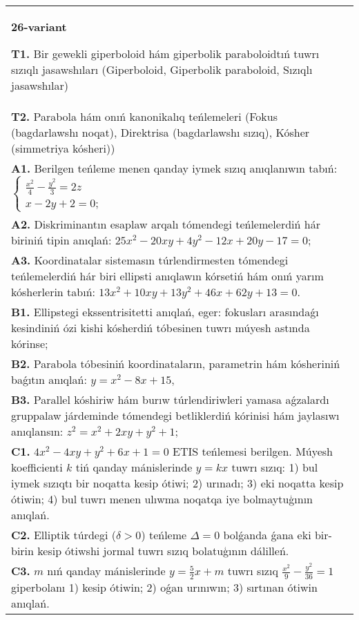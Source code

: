 \documentclass{article}
\begin{document}
\begin{tabular}{m{17cm}}
\textbf{26-variant}
\newline

\textbf{T1.} Bir gewekli giperboloid hám giperbolik paraboloidtıń tuwrı sızıqlı jasawshıları (Giperboloid, Giperbolik paraboloid, Sızıqlı jasawshılar) \\
\textbf{T2.} Parabola hám onıń kanonikalıq teńlemeleri (Fokus (bagdarlawshı noqat), Direktrisa (bagdarlawshı sızıq), Kósher (simmetriya kósheri)) \\
\textbf{A1.} Berilgen teńleme menen qanday iymek sızıq anıqlanıwın tabıń: $\left\{\begin{array}{l}\frac{x^2}{4}-\frac{y^2}{3}=2 z \\ x-2 y+2=0 ;\end{array}\right.$ \\
\textbf{A2.} Diskriminantın esaplaw arqalı tómendegi teńlemelerdiń hár biriniń tipin anıqlań: $25 x^2-20 x y+4 y^2-12 x+20 y-17=0$; \\
\textbf{A3.} Koordinatalar sistemasın túrlendirmesten tómendegi teńlemelerdiń hár biri ellipsti anıqlawın kórsetiń hám onıń yarım kósherlerin tabıń: $13 x^2+10 x y+13 y^2+46 x+62 y+13=0$. \\
\textbf{B1.} Ellipstegi ekssentrisitetti anıqlań, eger: fokusları arasındaǵı kesindiniń ózi kishi kósherdiń tóbesinen tuwrı múyesh astında kórinse; \\
\textbf{B2.} Parabola tóbesiniń koordinataların, parametrin hám kósheriniń baǵıtın anıqlań: $y=x^2-8 x+15$, \\
\textbf{B3.} Parallel kóshiriw hám burıw túrlendiriwleri yamasa aǵzalardı gruppalaw járdeminde tómendegi betliklerdiń kórinisi hám jaylasıwı anıqlansın: $z^2=x^2+2 x y+y^2+1$; \\
\textbf{C1.} $4 x^2-4 x y+y^2+6 x+1=0$ ETIS teńlemesi berilgen. Múyesh koefficienti $k$ tiń qanday mánislerinde $y=kx$ tuwrı sızıq: 1) bul iymek sızıqtı bir noqatta kesip ótiwi; 2) urınadı; 3) eki noqatta kesip ótiwin; 4) bul tuwrı menen ulıwma noqatqa iye bolmaytuģının anıqlań. \\
\textbf{C2.} Elliptik túrdegi ($\delta>0$) teńleme $\Delta=0$ bolǵanda ǵana eki bir-birin kesip ótiwshi jormal tuwrı sızıq bolatuģının dálilleń. \\
\textbf{C3.} $m$ nıń qanday mánislerinde $y=\frac{5}{2} x+m$ tuwrı sızıq $\frac{x^2}{9}-\frac{y^2}{36}=1$ giperbolanı 1) kesip ótiwin; 2) oǵan urınıwın; 3) sırtınan ótiwin anıqlań. \\

\end{tabular}
\vspace{1cm}
\end{document}
